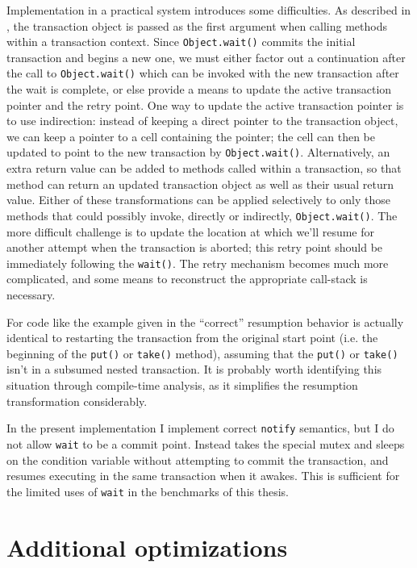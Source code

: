 Implementation in a practical system introduces some difficulties.  As
described in , the transaction object is passed as
the first argument when calling methods within a transaction context.
Since \texttt{Object.wait()} commits the initial transaction and
begins a new one, we must either factor out a continuation after the
call to \texttt{Object.wait()} which can be invoked with the new
transaction after the wait is complete, or else provide a means to
update the active transaction pointer and the retry point.  One way to
update the active transaction pointer is to use indirection: instead
of keeping a direct pointer to the transaction object, we can keep a
pointer to a cell containing the pointer; the cell can then be updated
to point to the new transaction by \texttt{Object.wait()}.
Alternatively, an extra return value can be added to methods called
within a transaction, so that method can return an updated transaction
object as well as their usual return value.  Either of these
transformations can be applied selectively to only those methods that
could possibly invoke, directly or indirectly, \texttt{Object.wait()}.
The more difficult challenge is to update the location at which we'll
resume for another attempt when the transaction is aborted; this retry
point should be immediately following the
\texttt{wait()}. The retry mechanism
becomes much more complicated, and some means to reconstruct the
appropriate call-stack is necessary.

For code like the example given in  the
``correct'' resumption behavior is actually identical to restarting
the transaction from the original start point (i.e. the beginning of
the \texttt{put()} or \texttt{take()} method), assuming that the
\texttt{put()} or \texttt{take()} isn't in a subsumed nested
transaction.  It is probably worth identifying this situation through
compile-time analysis, as it simplifies the resumption transformation
considerably.

In the present implementation I implement correct \texttt{notify} semantics,
but I do not allow \texttt{wait} to be a commit point.  Instead \flex
takes the special mutex and sleeps on the condition variable without
attempting to commit the transaction, and resumes executing in the same
transaction when it awakes.  This is sufficient for the limited uses of
\texttt{wait} in the benchmarks of this thesis.

\section{Additional optimizations}\label{sec:moreopt}

